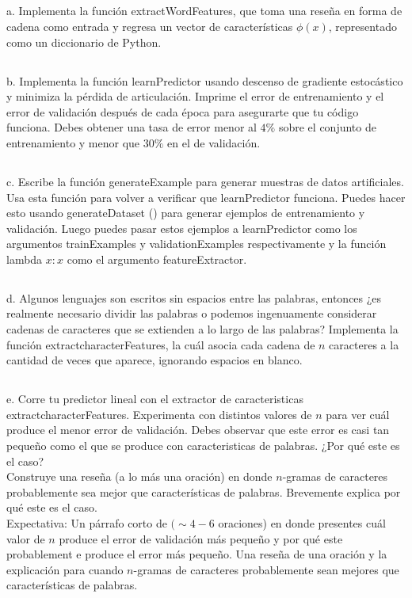 \documentclass{article}
\begin{document}
 \subsection{}
a. Implementa la función extractWordFeatures, que toma una reseña en forma de cadena como entrada y regresa un vector de características $\phi(x)$, representado como un
diccionario de Python.

\subsection{}
b. Implementa la función learnPredictor usando descenso de gradiente estocástico y minimiza la pérdida de articulación. Imprime el error de entrenamiento y el error de validación después de cada época para asegurarte que tu código funciona. Debes obtener una tasa de error menor al $4 \%$ sobre el conjunto de entrenamiento y menor que $30 \%$ en el de validación.

\subsection{}
c. Escribe la función generateExample para generar muestras de datos artificiales.
Usa esta función para volver a verificar que learnPredictor funciona. Puedes hacer esto usando generateDataset () para generar ejemplos de entrenamiento y validación. Luego puedes pasar estos ejemplos a learnPredictor como los argumentos trainExamples y validationExamples respectivamente y la función lambda $x: x$ como el argumento featureExtractor.

\subsection{}
d. Algunos lenguajes son escritos sin espacios entre las palabras, entonces ¿es realmente necesario dividir las palabras o podemos ingenuamente considerar cadenas de caracteres que se extienden a lo largo de las palabras? Implementa la función extractcharacterFeatures, la cuál asocia cada cadena de $n$ caracteres a la cantidad de veces que aparece, ignorando espacios en blanco.

\subsection{}
e. Corre tu predictor lineal con el extractor de caracteristicas extractcharacterFeatures. Experimenta con distintos valores de $n$ para ver cuál produce el menor error de validación. Debes observar que este error es casi tan pequeño como el que se produce con caracteristicas de palabras. ¿Por qué este es el caso?
\\
Construye una reseña (a lo más una oración) en donde $n$-gramas de caracteres probablemente sea mejor que características de palabras. Brevemente explica por qué este es el caso.\\
Expectativa: Un párrafo corto de $(\sim 4-6$ oraciones) en donde presentes cuál valor de $n$ produce el error de validación más pequeño y por qué este probablement e produce el error más pequeño. Una reseña de una oración y la explicación para cuando $n$-gramas de caracteres probablemente sean mejores que características de palabras.
\end{document}
